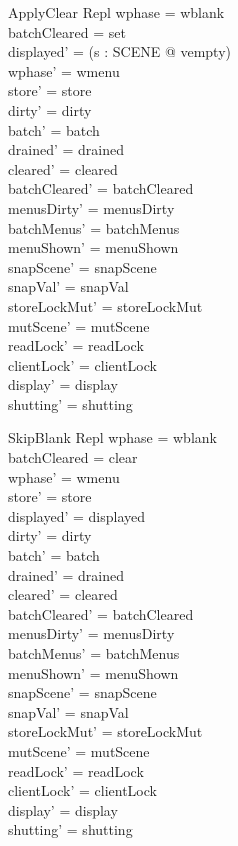 \documentclass[a4paper,10pt,fleqn]{article}
\begin{document}
\begin{schema}{ApplyClear}
  \Delta Repl
\where
  wphase = wblank \\
  batchCleared = set \\
  displayed' = (\lambda s : SCENE @ vempty) \\
  wphase' = wmenu \\
  store' = store \\
  dirty' = dirty \\
  batch' = batch \\
  drained' = drained \\
  cleared' = cleared \\
  batchCleared' = batchCleared \\
  menusDirty' = menusDirty \\
  batchMenus' = batchMenus \\
  menuShown' = menuShown \\
  snapScene' = snapScene \\
  snapVal' = snapVal \\
  storeLockMut' = storeLockMut \\
  mutScene' = mutScene \\
  readLock' = readLock \\
  clientLock' = clientLock \\
  display' = display \\
  shutting' = shutting
\end{schema}

\begin{schema}{SkipBlank}
  \Delta Repl
\where
  wphase = wblank \\
  batchCleared = clear \\
  wphase' = wmenu \\
  store' = store \\
  displayed' = displayed \\
  dirty' = dirty \\
  batch' = batch \\
  drained' = drained \\
  cleared' = cleared \\
  batchCleared' = batchCleared \\
  menusDirty' = menusDirty \\
  batchMenus' = batchMenus \\
  menuShown' = menuShown \\
  snapScene' = snapScene \\
  snapVal' = snapVal \\
  storeLockMut' = storeLockMut \\
  mutScene' = mutScene \\
  readLock' = readLock \\
  clientLock' = clientLock \\
  display' = display \\
  shutting' = shutting
\end{schema}
\end{document}
